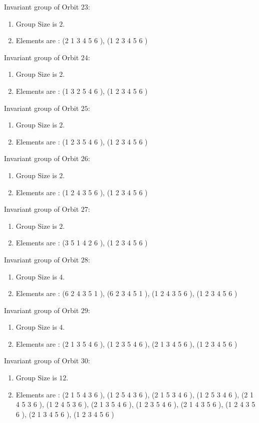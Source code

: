 \documentclass[12pt]{article}
\begin{document}
Invariant group of Orbit $23$:
\begin{enumerate}
\item Group Size is $2$.
\item Elements are : (2 1 3 4 5 6  ), (1 2 3 4 5 6  )
\end{enumerate}
Invariant group of Orbit $24$:
\begin{enumerate}
\item Group Size is $2$.
\item Elements are : (1 3 2 5 4 6  ), (1 2 3 4 5 6  )
\end{enumerate}
Invariant group of Orbit $25$:
\begin{enumerate}
\item Group Size is $2$.
\item Elements are : (1 2 3 5 4 6  ), (1 2 3 4 5 6  )
\end{enumerate}
Invariant group of Orbit $26$:
\begin{enumerate}
\item Group Size is $2$.
\item Elements are : (1 2 4 3 5 6  ), (1 2 3 4 5 6  )
\end{enumerate}
Invariant group of Orbit $27$:
\begin{enumerate}
\item Group Size is $2$.
\item Elements are : (3 5 1 4 2 6  ), (1 2 3 4 5 6  )
\end{enumerate}
Invariant group of Orbit $28$:
\begin{enumerate}
\item Group Size is $4$.
\item Elements are : (6 2 4 3 5 1  ), (6 2 3 4 5 1  ), (1 2 4 3 5 6  ), (1 2 3 4 5 6  )
\end{enumerate}
Invariant group of Orbit $29$:
\begin{enumerate}
\item Group Size is $4$.
\item Elements are : (2 1 3 5 4 6  ), (1 2 3 5 4 6  ), (2 1 3 4 5 6  ), (1 2 3 4 5 6  )
\end{enumerate}
Invariant group of Orbit $30$:
\begin{enumerate}
\item Group Size is $12$.
\item Elements are : (2 1 5 4 3 6  ), (1 2 5 4 3 6  ), (2 1 5 3 4 6  ), (1 2 5 3 4 6  ), (2 1 4 5 3 6  ), (1 2 4 5 3 6  ), (2 1 3 5 4 6  ), (1 2 3 5 4 6  ), (2 1 4 3 5 6  ), (1 2 4 3 5 6  ), (2 1 3 4 5 6  ), (1 2 3 4 5 6  )
\end{enumerate}
\end{document}
